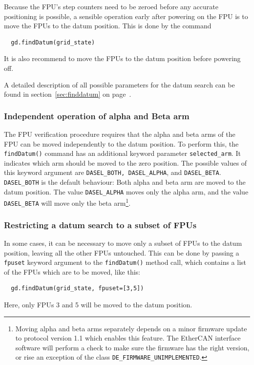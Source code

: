 \documentclass[11pt,a4paper]{scrartcl}
\begin{document}
Because the FPU's step counters need to be zeroed
before any accurate positioning is possible, a
sensible operation early after powering on
the FPU is to move the FPUs to the datum position.
This is done by the command

\begin{verbatim}
  gd.findDatum(grid_state)
\end{verbatim}

It is also recommend to move the FPUs to the datum position
before powering off. 

A detailed description of all possible
parameters for the datum search can be found in
section~\ref{sec:finddatum} on page~\pageref{sec:finddatum}.


\subsubsection{Independent operation of alpha and Beta arm}

The FPU verification procedure requires that the alpha and beta arms
of the FPU can be moved independently to the datum position.  To
perform this, the \texttt{findDatum()} command has an additional
keyword parameter \texttt{selected\_arm}. It indicates which arm
should be moved to the zero position. The possible values of this
keyword argument are \texttt{DASEL\_BOTH, DASEL\_ALPHA}, and
\texttt{DASEL\_BETA}.  \texttt{DASEL\_BOTH} is the default behaviour:
Both alpha and beta arm are moved to the datum position. The value
\texttt{DASEL\_ALPHA} moves only the alpha arm, and the value
\texttt{DASEL\_BETA} will move only the beta arm\footnote{Moving alpha
  and beta arms separately depends on a minor firmware update to
  protocol version 1.1 which enables this feature. The EtherCAN interface software
  will perform a check to make sure the firmware has the right
  version, or rise an exception of the class
  \texttt{DE\_FIRMWARE\_UNIMPLEMENTED}.}.


\subsubsection{Restricting a datum search to a subset of FPUs}
\label{sec:restricteddatumsearch}
  
In some cases, it can be necessary to move only a subset of FPUs to
the datum position, leaving all the other FPUs untouched. This can be
done by passing a \texttt{fpuset} keyword argument to the
\texttt{findDatum()} method call, which contains a list of the FPUs
which are to be moved, like this:
\begin{verbatim}
  gd.findDatum(grid_state, fpuset=[3,5])
\end{verbatim}
Here, only FPUs 3 and 5 will be moved to the datum position.
\end{document}

